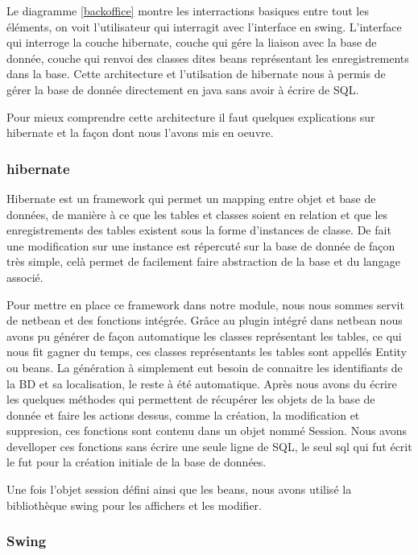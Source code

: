 \documentclass[11pt,a4paper]{article}
\begin{document}
Le diagramme \ref{backoffice} montre les interractions basiques entre tout les éléments, on voit l'utilisateur qui interragit avec l'interface en swing. L'interface qui interroge la couche hibernate, couche qui gére la liaison avec la base de donnée, couche qui renvoi des classes dites beans représentant les enregistrements dans la base. Cette architecture et l'utilsation de hibernate nous à permis de gérer la base de donnée directement en java sans avoir à écrire de SQL. 

Pour mieux comprendre cette architecture il faut quelques explications sur hibernate et la façon dont nous l'avons mis en oeuvre.

\subsubsection{hibernate}

Hibernate est un framework qui permet un mapping entre objet et base de données, de manière à ce que les tables et classes soient en relation et que les enregistrements des tables existent sous la forme d'instances de classe. De fait une modification sur une instance est répercuté sur la base de donnée de façon très simple, celà permet de facilement faire abstraction de la base et du langage associé.

Pour mettre en place ce framework dans notre module, nous nous sommes servit de netbean et des fonctions intégrée. Grâce au plugin intégré dans netbean nous avons pu générer de façon automatique les classes représentant les tables, ce qui nous fit gagner du temps, ces classes représentants les tables sont appellés Entity ou beans. La génération à simplement eut besoin de connaitre les identifiants de la BD et sa localisation, le reste à été automatique. Après nous avons du écrire les quelques méthodes qui permettent de récupérer les objets de la base de donnée et faire les actions dessus, comme la création, la modification et suppresion, ces fonctions sont contenu dans un objet nommé Session. Nous avons develloper ces fonctions sans écrire une seule ligne de SQL, le seul sql qui fut écrit le fut pour la création initiale de la base de données.

Une fois l'objet session défini ainsi que les beans, nous avons utilisé la bibliothèque swing pour les affichers et les modifier.

\subsubsection{Swing}
\end{document}
